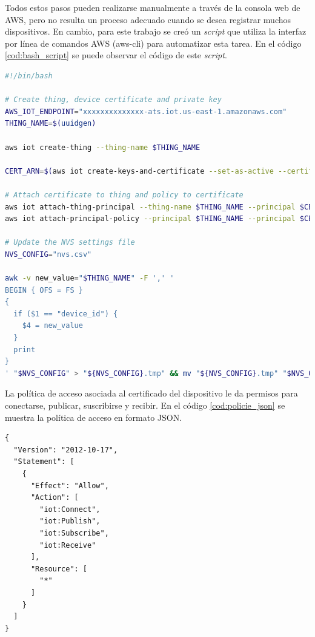 Todos estos pasos pueden realizarse manualmente a través de la consola web de AWS, pero no resulta un proceso adecuado cuando se desea registrar muchos dispositivos. En cambio, para este trabajo se creó un \textit{script} que utiliza la interfaz por línea de comandos AWS (aws-cli) \cite{awscli_info} para automatizar esta tarea. En el código \ref{cod:bash_script} se puede observar el código de este \textit{script}.

\begin{lstlisting}[language=bash, label=cod:bash_script, caption=\textit{Script} para automatizar el registro de un dispositivo en AWS IoT Core]
#!/bin/bash

# Create thing, device certificate and private key
AWS_IOT_ENDPOINT="xxxxxxxxxxxxxx-ats.iot.us-east-1.amazonaws.com"
THING_NAME=$(uuidgen)

aws iot create-thing --thing-name $THING_NAME

CERT_ARN=$(aws iot create-keys-and-certificate --set-as-active --certificate-pem-outfile device.pem.crt --private-key-outfile private.pem.key --query 'certificateArn' --output text)

# Attach certificate to thing and policy to certificate
aws iot attach-thing-principal --thing-name $THING_NAME --principal $CERT_ARN
aws iot attach-principal-policy --principal $THING_NAME --principal $CERT_ARN --policy-name IOT_ACCESS

# Update the NVS settings file
NVS_CONFIG="nvs.csv"

awk -v new_value="$THING_NAME" -F ',' '
BEGIN { OFS = FS }
{
  if ($1 == "device_id") {
    $4 = new_value
  }
  print
}
' "$NVS_CONFIG" > "${NVS_CONFIG}.tmp" && mv "${NVS_CONFIG}.tmp" "$NVS_CONFIG"
\end{lstlisting}

La política de acceso asociada al certificado del dispositivo le da permisos para conectarse, publicar, suscribirse y recibir. En el código \ref{cod:policie_json} se muestra la política de acceso en formato JSON.

\begin{lstlisting}[label=cod:policie_json,caption=Política de acceso asociada a los certificados de los dispositivos.]
{
  "Version": "2012-10-17",
  "Statement": [
    {
      "Effect": "Allow",
      "Action": [
        "iot:Connect",
        "iot:Publish",
        "iot:Subscribe",
        "iot:Receive"
      ],
      "Resource": [
        "*"
      ]
    }
  ]
}
\end{lstlisting}

